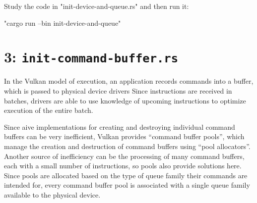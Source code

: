\documentclass[12pt,letterpaper]{article}
\newcommand{\inquotes}[1]{``#1''}	%
\begin{document}
	Study the code in "init-device-and-queue.rs" and then run it:
    	\begin{center}
    		"cargo run --bin init-device-and-queue"
    	\end{center}
      
\section{3: \texttt{init-command-buffer.rs}}
	In the Vulkan model of execution, an application records commands into a buffer, which is passed to physical device drivers Since instructions are received in batches, drivers are able to use knowledge of upcoming instructions to optimize execution of the entire batch. 
    
	Since aive implementations for creating and destroying individual command buffers can be very inefficient, Vulkan provides \inquotes{command buffer pools}, which manage the creation and destruction of command buffers using \inquotes{pool allocators}. Another source of inefficiency can be the processing of many command buffers, each with a small number of instructions, so pools also provide solutions here. Since pools are allocated based on the type of queue family their commands are intended for, every command buffer pool is associated with a single queue family available to the physical device.
	
\end{document}
